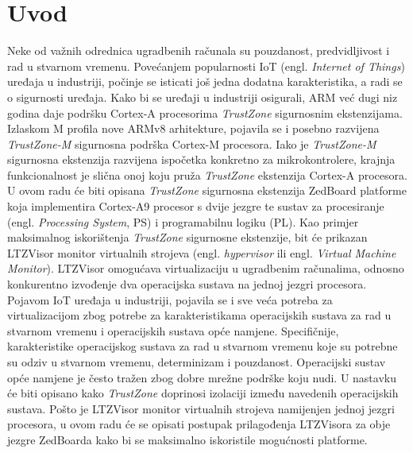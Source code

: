 \documentclass[times, utf8, diplomski, numeric]{fer}
\begin{document}
\chapter{Uvod}
Neke od važnih odrednica ugradbenih računala su pouzdanost, predvidljivost i rad u stvarnom vremenu.
Povećanjem popularnosti IoT (engl. \textit{Internet of Things}) uređaja u industriji, počinje se isticati
još jedna dodatna karakteristika, a radi se o sigurnosti uređaja. Kako bi se uređaji u industriji osigurali,
ARM već dugi niz godina daje podršku Cortex-A procesorima \textit{TrustZone} sigurnosnim ekstenzijama.
Izlaskom M profila nove ARMv8 arhitekture, pojavila se i posebno razvijena \textit{TrustZone-M} sigurnosna
podrška Cortex-M procesora. Iako je \textit{TrustZone-M} sigurnosna ekstenzija razvijena ispočetka konkretno
za mikrokontrolere, krajnja funkcionalnost je slična onoj koju pruža \textit{TrustZone} ekstenzija Cortex-A
procesora.\\
U ovom radu će biti opisana \textit{TrustZone} sigurnosna ekstenzija ZedBoard platforme koja implementira
Cortex-A9 procesor s dvije jezgre te sustav za procesiranje (engl. \textit{Processing System}, PS) i programabilnu
logiku (PL). Kao primjer maksimalnog iskorištenja \textit{TrustZone} sigurnosne
ekstenzije, bit će prikazan LTZVisor monitor virtualnih strojeva (engl. \textit{hypervisor} ili engl.
\textit{Virtual Machine Monitor}). LTZVisor omogućava virtualizaciju u ugradbenim računalima, odnosno konkurentno
izvođenje dva operacijska sustava na jednoj jezgri procesora. Pojavom IoT uređaja u industriji, pojavila
se i sve veća potreba za virtualizacijom zbog potrebe za karakteristikama operacijskih sustava za rad u stvarnom
vremenu i operacijskih sustava opće namjene. Specifičnije, karakteristike operacijskog sustava za rad u
stvarnom vremenu koje su potrebne su odziv u stvarnom vremenu, determinizam i pouzdanost. Operacijski
sustav opće namjene je često tražen zbog dobre mrežne podrške koju nudi. U nastavku će biti opisano kako
\textit{TrustZone} doprinosi izolaciji između navedenih operacijskih sustava. Pošto je LTZVisor monitor
virtualnih strojeva namijenjen jednoj jezgri procesora, u ovom radu će se opisati postupak prilagođenja
LTZVisora za obje jezgre ZedBoarda kako bi se maksimalno iskoristile mogućnosti platforme.
\end{document}
